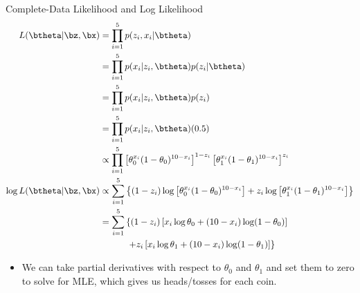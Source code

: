 \documentclass[dvipdfmx,bigger,aspectratio=169]{beamer}
\begin{document}
\begin{frame}[allowframebreaks,label=,t]{Complete-Data Likelihood and Log Likelihood}
\begin{align*}
  L(\btheta | \bz,\bx)
  &= \prod^{5}_{i=1} p(z_{i},x_{i} | \btheta)\\
  &= \prod^{5}_{i=1} p(x_{i} | z_{i}, \btheta) p(z_{i} | \btheta)\\
  &= \prod^{5}_{i=1} p(x_{i} | z_{i}, \btheta) p(z_{i})\\
  &= \prod^{5}_{i=1} p(x_{i} | z_{i}, \btheta) (0.5)\\
  &\propto \prod^{5}_{i=1}
    \left[ \theta_{0}^{x_{i}}(1-\theta_{0})^{10-x_{i}} \right]^{1-z_{i}}
    \left[ \theta_{1}^{x_{i}}(1-\theta_{1})^{10-x_{i}} \right]^{z_{i}}\\
  \log L(\btheta | \bz,\bx)
  &\propto \sum^{5}_{i=1}
    \left\{
    (1-z_{i}) \log \left[ \theta_{0}^{x_{i}}(1-\theta_{0})^{10-x_{i}} \right] +
    z_{i} \log \left[ \theta_{1}^{x_{i}}(1-\theta_{1})^{10-x_{i}} \right]
    \right\}\\
  &= \sum^{5}_{i=1}
    \left\{
    (1-z_{i}) \left[ x_{i}\log\theta_{0} + (10-x_{i})\log(1-\theta_{0})\right]
    \right.\\
  &~~~~~~~~~ \left.
    + z_{i} \left[ x_{i}\log\theta_{1} + (10-x_{i})\log(1-\theta_{1})\right]
    \right\}
\end{align*}
\begin{itemize}
\item We can take partial derivatives with respect to \(\theta_{0}\) and \(\theta_{1}\) and set them to zero to solve for MLE, which gives us heads/tosses for each coin.
\end{itemize}
\end{frame}
\end{document}
